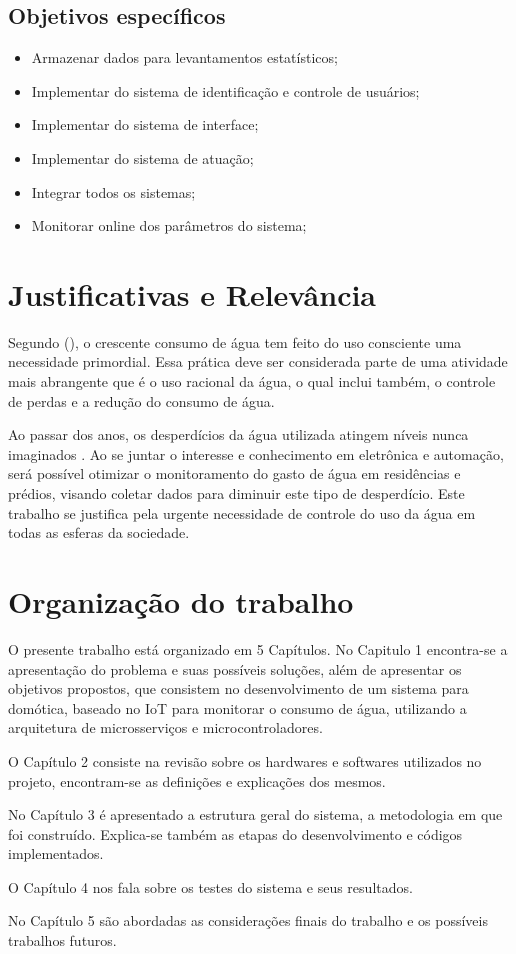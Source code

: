 \subsection{Objetivos específicos}

\begin{itemize}
	\item Armazenar dados para levantamentos estatísticos;
	\item Implementar do sistema de identificação e controle de usuários;
	\item Implementar do sistema de interface;
	\item Implementar do sistema de atuação;
	\item Integrar todos os sistemas;
	\item Monitorar online dos parâmetros do sistema;
\end{itemize}

\section{Justificativas e Relev{\^a}ncia}
%
Segundo \citeauthor{AlvesDaSilva} (\citeyear{AlvesDaSilva}), o crescente consumo de água
tem feito do uso consciente uma necessidade primordial. Essa prática deve ser considerada parte de uma atividade mais abrangente que é o uso racional da água, o qual inclui também, o controle de perdas e a redução do consumo de água.

Ao passar dos anos, os desperdícios da água utilizada atingem níveis nunca imaginados \cite{rebouccas2003agua}. Ao se juntar o interesse e conhecimento em eletrônica e automação, será possível otimizar o monitoramento do gasto de água em residências e prédios, visando coletar dados para diminuir este tipo de desperdício. Este trabalho se justifica pela urgente necessidade de controle do uso da água em todas as esferas da sociedade. 
%
\section{Organização do trabalho}

O presente trabalho está organizado em 5 Capítulos. No Capitulo 1 encontra-se a apresentação do problema e suas possíveis soluções, além de apresentar os objetivos propostos, que consistem no desenvolvimento de um sistema para domótica, baseado no IoT para monitorar o consumo de água, utilizando a arquitetura de microsserviços e microcontroladores.

O Capítulo 2 consiste na revisão sobre os hardwares e softwares utilizados no projeto, encontram-se as definições e explicações dos mesmos.

No Capítulo 3 é apresentado a estrutura geral do sistema, a metodologia em que foi construído. Explica-se também as etapas do desenvolvimento e códigos implementados.

O Capítulo 4 nos fala sobre os testes do sistema e seus resultados.

No Capítulo 5 são abordadas as considerações finais do trabalho e os possíveis trabalhos futuros.